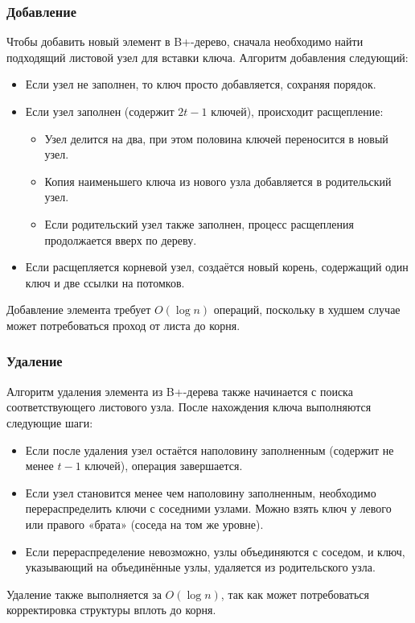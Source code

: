 \documentclass[10pt,a4paper,final]{article} %
\begin{document}
\subsubsection{Добавление}
Чтобы добавить новый элемент в B+-дерево, сначала необходимо найти подходящий листовой узел для вставки ключа. Алгоритм добавления следующий:
\begin{itemize}
	\item Если узел не заполнен, то ключ просто добавляется, сохраняя порядок. 
	\item Если узел заполнен (содержит $2t - 1$ ключей), происходит расщепление:
	\begin{itemize}
		\item Узел делится на два, при этом половина ключей переносится в новый узел.
		\item Копия наименьшего ключа из нового узла добавляется в родительский узел.
		\item Если родительский узел также заполнен, процесс расщепления продолжается вверх по дереву.
	\end{itemize}
	\item Если расщепляется корневой узел, создаётся новый корень, содержащий один ключ и две ссылки на потомков.
\end{itemize}
Добавление элемента требует $O(\log n)$ операций, поскольку в худшем случае может потребоваться проход от листа до корня.

\subsubsection{Удаление}
Алгоритм удаления элемента из B+-дерева также начинается с поиска соответствующего листового узла. После нахождения ключа выполняются следующие шаги:
\begin{itemize}
	\item Если после удаления узел остаётся наполовину заполненным (содержит не менее $t - 1$ ключей), операция завершается.
	\item Если узел становится менее чем наполовину заполненным, необходимо перераспределить ключи с соседними узлами. Можно взять ключ у левого или правого «брата» (соседа на том же уровне).
	\item Если перераспределение невозможно, узлы объединяются с соседом, и ключ, указывающий на объединённые узлы, удаляется из родительского узла.
\end{itemize}
Удаление также выполняется за $O(\log n)$, так как может потребоваться корректировка структуры вплоть до корня.
\end{document}
